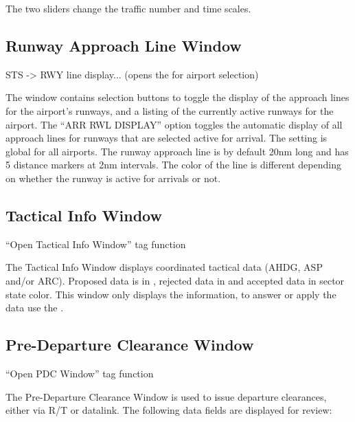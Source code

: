 \documentclass[a4paper,oneside,11pt]{memoir}
\begin{document}
\bigskip

The two sliders change the traffic number and time scales.

\subsection{Runway Approach Line Window}
\label{win:ralw}

 STS -> RWY line display... (opens the  for airport selection)

\bigskip


The window contains selection buttons to toggle the display of the approach lines for the airport’s runways, and a listing of the currently active runways for the airport. The “ARR RWL DISPLAY” option toggles the automatic display of all approach lines for runways that are selected active for arrival. The setting is global for all airports. The runway approach line is by default 20nm long and has 5 distance markers at 2nm intervals. The color of the line is different depending on whether the runway is active for arrivals or not.

\subsection{Tactical Info Window}
\label{win:tiw}

“Open Tactical Info Window” tag function

\bigskip


The Tactical Info Window displays coordinated tactical data (AHDG, ASP and/or ARC). Proposed data is in , rejected data in  and accepted data in sector state color. This window only displays the information, to answer or apply the data use the .

\subsection{Pre-Departure Clearance Window}
\label{win:dlpdcw}

“Open PDC Window” tag function

\bigskip


The Pre-Departure Clearance Window is used to issue departure clearances, either via R/T or datalink. The following data fields are displayed for review:
\end{document}
